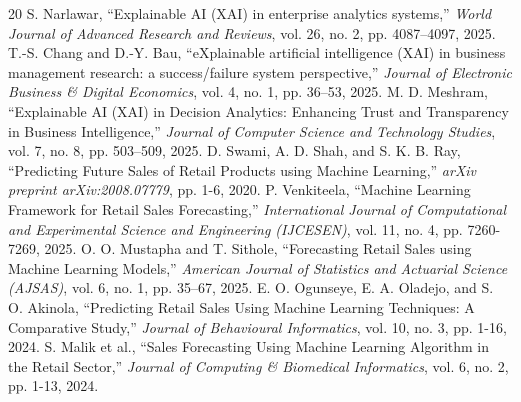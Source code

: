 \documentclass[conference]{IEEEtran}
\begin{document}
\begin{thebibliography}{20}
 S. Narlawar, ``Explainable AI (XAI) in enterprise analytics systems,'' \emph{World Journal of Advanced Research and Reviews}, vol. 26, no. 2, pp. 4087–4097, 2025.
 T.-S. Chang and D.-Y. Bau, ``eXplainable artificial intelligence (XAI) in business management research: a success/failure system perspective,'' \emph{Journal of Electronic Business \& Digital Economics}, vol. 4, no. 1, pp. 36–53, 2025.
 M. D. Meshram, ``Explainable AI (XAI) in Decision Analytics: Enhancing Trust and Transparency in Business Intelligence,'' \emph{Journal of Computer Science and Technology Studies}, vol. 7, no. 8, pp. 503–509, 2025.
 D. Swami, A. D. Shah, and S. K. B. Ray, ``Predicting Future Sales of Retail Products using Machine Learning,'' \emph{arXiv preprint arXiv:2008.07779}, pp. 1-6, 2020.
 P. Venkiteela, ``Machine Learning Framework for Retail Sales Forecasting,'' \emph{International Journal of Computational and Experimental Science and Engineering (IJCESEN)}, vol. 11, no. 4, pp. 7260-7269, 2025.
 O. O. Mustapha and T. Sithole, ``Forecasting Retail Sales using Machine Learning Models,'' \emph{American Journal of Statistics and Actuarial Science (AJSAS)}, vol. 6, no. 1, pp. 35–67, 2025.
 E. O. Ogunseye, E. A. Oladejo, and S. O. Akinola, ``Predicting Retail Sales Using Machine Learning Techniques: A Comparative Study,'' \emph{Journal of Behavioural Informatics}, vol. 10, no. 3, pp. 1-16, 2024.
 S. Malik et al., ``Sales Forecasting Using Machine Learning Algorithm in the Retail Sector,'' \emph{Journal of Computing \& Biomedical Informatics}, vol. 6, no. 2, pp. 1-13, 2024.
\end{thebibliography}
\end{document}
